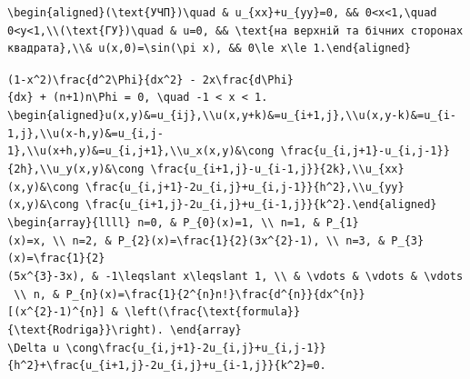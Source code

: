 \documentclass[
  ukrainian,
]{article}
\begin{document}
\begin{verbatim}
\begin{aligned}(\text{УЧП})\quad & u_{xx}+u_{yy}=0, && 0<x<1,\quad 0<y<1,\\(\text{ГУ})\quad & u=0, && \text{на верхній та бічних сторонах квадрата},\\& u(x,0)=\sin(\pi x), && 0\le x\le 1.\end{aligned}
\end{verbatim}

\texttt{(1-x\^{}2)\textbackslash{}frac\{d\^{}2\textbackslash{}Phi\}\{dx\^{}2\}\ -\ 2x\textbackslash{}frac\{d\textbackslash{}Phi\}\{dx\}\ +\ (n+1)n\textbackslash{}Phi\ =\ 0,\ \textbackslash{}quad\ -1\ \textless{}\ x\ \textless{}\ 1.}
\texttt{\textbackslash{}begin\{aligned\}u(x,y)\&=u\_\{ij\},\textbackslash{}\textbackslash{}u(x,y+k)\&=u\_\{i+1,j\},\textbackslash{}\textbackslash{}u(x,y-k)\&=u\_\{i-1,j\},\textbackslash{}\textbackslash{}u(x-h,y)\&=u\_\{i,j-1\},\textbackslash{}\textbackslash{}u(x+h,y)\&=u\_\{i,j+1\},\textbackslash{}\textbackslash{}u\_x(x,y)\&\textbackslash{}cong\ \textbackslash{}frac\{u\_\{i,j+1\}-u\_\{i,j-1\}\}\{2h\},\textbackslash{}\textbackslash{}u\_y(x,y)\&\textbackslash{}cong\ \textbackslash{}frac\{u\_\{i+1,j\}-u\_\{i-1,j\}\}\{2k\},\textbackslash{}\textbackslash{}u\_\{xx\}(x,y)\&\textbackslash{}cong\ \textbackslash{}frac\{u\_\{i,j+1\}-2u\_\{i,j\}+u\_\{i,j-1\}\}\{h\^{}2\},\textbackslash{}\textbackslash{}u\_\{yy\}(x,y)\&\textbackslash{}cong\ \textbackslash{}frac\{u\_\{i+1,j\}-2u\_\{i,j\}+u\_\{i-1,j\}\}\{k\^{}2\}.\textbackslash{}end\{aligned\}}
\texttt{\textbackslash{}begin\{array\}\{llll\}\ n=0,\ \&\ P\_\{0\}(x)=1,\ \textbackslash{}\textbackslash{}\ n=1,\ \&\ P\_\{1\}(x)=x,\ \textbackslash{}\textbackslash{}\ n=2,\ \&\ P\_\{2\}(x)=\textbackslash{}frac\{1\}\{2\}(3x\^{}\{2\}-1),\ \textbackslash{}\textbackslash{}\ n=3,\ \&\ P\_\{3\}(x)=\textbackslash{}frac\{1\}\{2\}(5x\^{}\{3\}-3x),\ \&\ -1\textbackslash{}leqslant\ x\textbackslash{}leqslant\ 1,\ \textbackslash{}\textbackslash{}\ \&\ \textbackslash{}vdots\ \&\ \textbackslash{}vdots\ \&\ \textbackslash{}vdots\ \textbackslash{}\textbackslash{}\ n,\ \&\ P\_\{n\}(x)=\textbackslash{}frac\{1\}\{2\^{}\{n\}n!\}\textbackslash{}frac\{d\^{}\{n\}\}\{dx\^{}\{n\}\}{[}(x\^{}\{2\}-1)\^{}\{n\}{]}\ \&\ \textbackslash{}left(\textbackslash{}frac\{\textbackslash{}text\{formula\}\}\{\textbackslash{}text\{Rodriga\}\}\textbackslash{}right).\ \textbackslash{}end\{array\}}
\texttt{\textbackslash{}Delta\ u\ \textbackslash{}cong\textbackslash{}frac\{u\_\{i,j+1\}-2u\_\{i,j\}+u\_\{i,j-1\}\}\{h\^{}2\}+\textbackslash{}frac\{u\_\{i+1,j\}-2u\_\{i,j\}+u\_\{i-1,j\}\}\{k\^{}2\}=0.}
\end{document}
